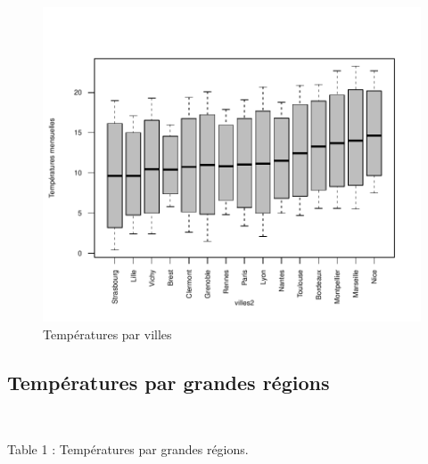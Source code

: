 \documentclass[
]{article}
\begin{document}
\begin{figure}[h]

{\centering \includegraphics{rapport_bad_G3V2_files/figure-latex/datatempville-1} 

}

\caption{Températures par villes\label{fig:tempvilles}}\label{fig:datatempville}
\end{figure}

\hypertarget{tempuxe9ratures-par-grandes-ruxe9gions}{%
\subsection{\texorpdfstring{\textbf{Températures par grandes
régions}}{Températures par grandes régions}}\label{tempuxe9ratures-par-grandes-ruxe9gions}}

~

\begin{center}Table 1 : Températures par grandes régions.\end{center}
\end{document}
